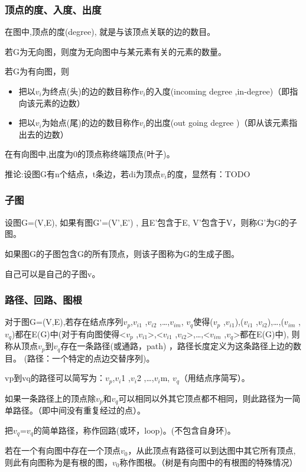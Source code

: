 \documentclass[AutoFakeBold]{LZUThesis2007}
\begin{document}
			\subsubsection{顶点的度、入度、出度}
在图中,顶点的度(degree), 就是与该顶点关联的边的数目。

若G为无向图，则度为无向图中与某元素有关的元素的数量。

若G为有向图，则
\begin{itemize}
	\item 把以$v_{i}$为终点(头)的边的数目称作$v_{i}$的入度(incoming degree ,in-degree)（即指向该元素的边数）
	\item 把以$v_{i}$为始点(尾)的边的数目称作$v_{i}$的出度(out going degree )（即从该元素指出去的边数）
\end{itemize}

在有向图中,出度为0的顶点称终端顶点(叶子)。

推论:设图G有n个结点，t条边，若di为顶点$v_{i}$的度，显然有：TODO



			\subsubsection{子图}
设图G=(V,E), 如果有图G'=(V',E') , 且E'包含于E, V'包含于V，则称G'为G的子图。

如果图G的子图包含G的所有顶点，则该子图称为G的生成子图。

自己可以是自己的子图v。

			\subsubsection{路径、回路、图根}
对于图G=(V,E),若存在结点序列$v_{p}$,$v_{i1}$ ,$v_{i2}$ ,…,$v_{im}$, $v_{q}$使得($v_{p}$ ,$v_{i1}$),($v_{i1}$ ,$v_{i2}$),…,($v_{im}$ ,$v_{q}$)都在E(G)中(对于有向图使得<$v_{p}$ ,$v_{i1}$>,<$v_{i1}$ ,$v_{i2}$>,…,<$v_{im}$ ,$v_{q}$>都在E(G)中), 则称从顶点$v_{p}$到$v_{q}$存在一条路径(或通路，path) ，路径长度定义为这条路径上边的数目。 (路径：一个特定的点边交替序列)。

vp到vq的路径可以简写为：$v_{p}$,$v_{i}$1 ,$v_{i}$2 ,…,$v_{i}$m, $v_{q}$（用结点序简写）。

如果一条路径上的顶点除$v_{p}$和$v_{q}$可以相同以外其它顶点都不相同，则此路径为一简单路径。（即中间没有重复经过的点）。

把$v_{q}$=$v_{q}$的简单路径，称作回路(或环，loop)。(不包含自身环)。

若在一个有向图中存在一个顶点$v_{0}$，从此顶点有路径可以到达图中其它所有顶点,则此有向图称为是有根的图，$v_{0}$称作图根。（树是有向图中的有根图的特殊情况）
\end{document}
